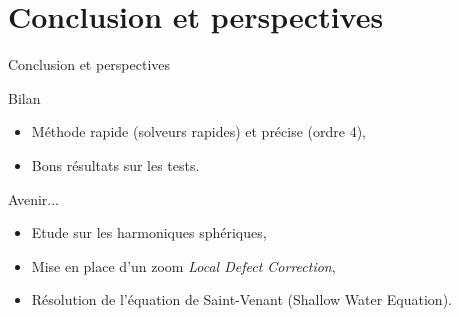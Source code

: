 \documentclass[11pt]{beamer}
\begin{document}
\section{Conclusion et perspectives}
\begin{frame}{Conclusion et perspectives}
\begin{block}{Bilan}
\begin{itemize}
\item Méthode rapide (solveurs rapides) et précise (ordre 4),

\item Bons résultats sur les tests.
\end{itemize}
\end{block}

\pause

\begin{block}{Avenir...}
\begin{itemize}
\item Etude sur les harmoniques sphériques,

\item Mise en place d'un zoom \textit{Local Defect Correction},

\item Résolution de l'équation de Saint-Venant (Shallow Water Equation).
\end{itemize}
\end{block}
\end{frame}

\end{document}
